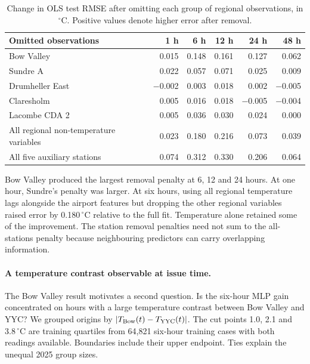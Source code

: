 \documentclass[11pt,letterpaper]{article}
\newcommand{\thead}[1]{\textbf{#1}}\newcommand{\bestscore}[1]{\textbf{#1}}
\newcommand{\celsius}{\ensuremath{^{\circ}\mathrm{C}}}\newcommand{\code}[1]{\texttt{\small #1}}
\begin{document}
\begin{table}[!htbp]
\centering\small
\caption{Change in OLS test RMSE after omitting each group of regional observations, in \celsius. Positive values denote higher error after removal.}\label{tab:ablation}
\renewcommand{\arraystretch}{1.10}\begin{tabular*}{.96\linewidth}{@{\extracolsep{\fill}}lrrrrr@{}}\toprule\thead{Omitted observations}&\thead{1 h}&\thead{6 h}&\thead{12 h}&\thead{24 h}&\thead{48 h}\\\midrule
Bow Valley & 0.015 & 0.148 & 0.161 & 0.127 & 0.062 \\
Sundre A & 0.022 & 0.057 & 0.071 & 0.025 & 0.009 \\
Drumheller East & −0.002 & 0.003 & 0.018 & 0.002 & −0.005 \\
Claresholm & 0.005 & 0.016 & 0.018 & −0.005 & −0.004 \\
Lacombe CDA 2 & 0.005 & 0.036 & 0.030 & 0.024 & 0.000 \\
All regional non-temperature variables & 0.023 & 0.180 & 0.216 & 0.073 & 0.039 \\
All five auxiliary stations & 0.074 & 0.312 & 0.330 & 0.206 & 0.064 \\
\bottomrule\end{tabular*}
\end{table}


Bow Valley produced the largest removal penalty at 6, 12 and 24 hours. At one hour, Sundre's penalty was larger. At six hours, using all regional temperature lags alongside the airport features but dropping the other regional variables raised error by 0.180\,\celsius{} relative to the full fit. Temperature alone retained some of the improvement. The station removal penalties need not sum to the all-stations penalty because neighbouring predictors can carry overlapping information.

\paragraph{A temperature contrast observable at issue time.}
The Bow Valley result motivates a second question. Is the six-hour MLP gain concentrated on hours with a large temperature contrast between Bow Valley and YYC? We grouped origins by $|T_{\rm Bow}(t)-T_{\rm YYC}(t)|$. The cut points 1.0, 2.1 and 3.8\,\celsius{} are training quartiles from 64,821 six-hour training cases with both readings available. Boundaries include their upper endpoint. Ties explain the unequal 2025 group sizes.
\end{document}
